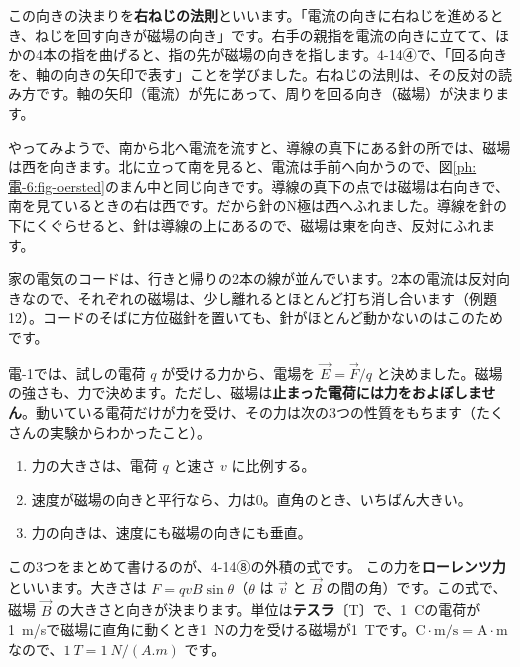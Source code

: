 \noindent\label{ph:電-6:migineji}この向きの決まりを\textbf{右ねじの法則}といいます。「電流の向きに右ねじを進めるとき、ねじを回す向きが磁場の向き」です。右手の親指を電流の向きに立てて、ほかの4本の指を曲げると、指の先が磁場の向きを指します。4-14④で、「回る向きを、軸の向きの矢印で表す」ことを学びました。右ねじの法則は、その反対の読み方です。軸の矢印（電流）が先にあって、周りを回る向き（磁場）が決まります。

やってみようで、南から北へ電流を流すと、導線の真下にある針の所では、磁場は西を向きます。北に立って南を見ると、電流は手前へ向かうので、図\ref{ph:電-6:fig-oersted}のまん中と同じ向きです。導線の真下の点では磁場は右向きで、南を見ているときの右は西です。だから針のN極は西へふれました。導線を針の下にくぐらせると、針は導線の上にあるので、磁場は東を向き、反対にふれます。

\begin{phmijika}[電気のコードのそばの方位磁針]
家の電気のコードは、行きと帰りの2本の線が並んでいます。2本の電流は反対向きなので、それぞれの磁場は、少し離れるとほとんど打ち消し合います（例題12）。コードのそばに方位磁針を置いても、針がほとんど動かないのはこのためです。
\end{phmijika}

\label{ph:電-6:sec3}
電-1では、試しの電荷 $q$ が受ける力から、電場を $\vec E=\vec F/q$ と決めました。磁場の強さも、力で決めます。ただし、磁場は\textbf{止まった電荷には力をおよぼしません}。動いている電荷だけが力を受け、その力は次の3つの性質をもちます（たくさんの実験からわかったこと）。
\begin{enumerate}[label={\bkcircled{\arabic*}}, leftmargin=2.4\zw, itemsep=1pt, topsep=2pt]
\item 力の大きさは、電荷 $q$ と速さ $v$ に比例する。
\item 速度が磁場の向きと平行なら、力は0。直角のとき、いちばん大きい。
\item 力の向きは、速度にも磁場の向きにも垂直。
\end{enumerate}
この3つをまとめて書けるのが、4-14⑧の外積の式です。
\label{ph:電-6:lorentzdef}この力を\textbf{ローレンツ力}といいます。大きさは $F=qvB\sin\theta$（$\theta$ は $\vec v$ と $\vec B$ の間の角）です。この式で、磁場 $\vec B$ の大きさと向きが決まります。単位は\textbf{テスラ}〔T〕で、\qty{1}{C}の電荷が\qty{1}{m/s}で磁場に直角に動くとき\qty{1}{N}の力を受ける磁場が\qty{1}{T}です。$\mathrm{C}\cdot\mathrm{m/s}=\mathrm{A}\cdot\mathrm{m}$ なので、$\qty{1}{T}=\qty{1}{N/(A.m)}$ です。


